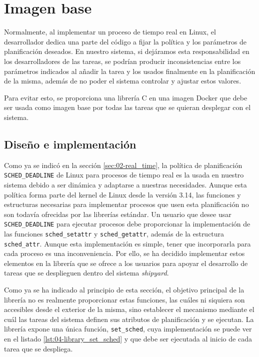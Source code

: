 \section{Imagen base}

Normalmente, al implementar un proceso de tiempo real en Linux, el desarrollador
dedica una parte del código a fijar la política y los parámetros de
planificación deseados. En nuestro sistema, si dejáramos esta responsabilidad en
los desarrolladores de las tareas, se podrían producir inconsistencias entre los
parámetros indicados al añadir la tarea y los usados finalmente en la
planificación de la misma, además de no poder el sistema controlar y ajustar
estos valores.

Para evitar esto, se proporciona una librería C en una imagen Docker que debe
ser usada como imagen base por todas las tareas que se quieran desplegar con el
sistema.

\subsection{Diseño e implementación}

Como ya se indicó en la sección \ref{sec:02-real_time}, la política de
planificación \texttt{SCHED\_DEADLINE} de Linux para procesos de tiempo real es
la usada en nuestro sistema debido a ser dinámica y adaptarse a nuestras
necesidades. Aunque esta política forma parte del kernel de Linux desde la
versión 3.14, las funciones y estructuras necesarias para implementar procesos
que usen esta planificación no son todavía ofrecidas por las librerías estándar.
Un usuario que desee usar \texttt{SCHED\_DEADLINE} para ejecutar procesos debe
proporcionar la implementación de las funciones \texttt{sched\_setattr} y
\texttt{sched\_getattr}, además de la estructura \texttt{sched\_attr}. Aunque
esta implementación es simple, tener que incorporarla para cada proceso es una
inconveniencia. Por ello, se ha decidido implementar estos elementos en la
librería que se ofrece a los usuarios para apoyar el desarrollo de tareas que se
desplieguen dentro del sistema \textit{shipyard}.

Como ya se ha indicado al principio de esta sección, el objetivo principal de la
librería no es realmente proporcionar estas funciones, las cuáles ni siquiera
son accesibles desde el exterior de la misma, sino establecer el mecanismo
mediante el cuál las tareas del sistema definen sus atributos de planificación y
se ejecutan. La librería expone una única función, \texttt{set\_sched}, cuya
implementación se puede ver en el listado \ref{lst:04-library_set_sched} y que
debe ser ejecutada al inicio de cada tarea que se despliega.

